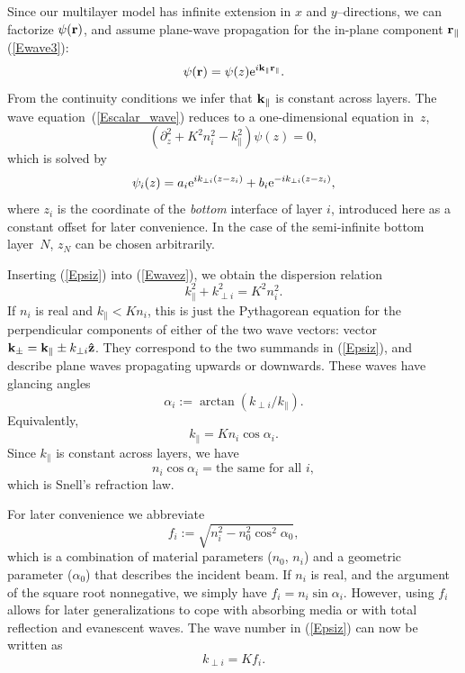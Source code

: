 Since our multilayer model has infinite extension
in $x$ and $y$--directions, we can factorize
$\psi(\mathbf{r})$, and assume plane-wave propagation for
the in-plane component $\mathbf{r}_\parallel$ (\ref{Ewave3}):
\begin{equation}\label{Ewave3dup}
\psi(\mathbf{r}) = \psi(z) {\rm e}^{i \mathbf{k}_\parallel\mathbf{r}_\parallel}.
\end{equation}
From the continuity conditions we infer that $\mathbf{k}_\parallel$
is constant across layers.
The wave equation~(\ref{Escalar_wave})
reduces to a one-dimensional equation in~$z$,
\begin{equation}\label{Ewavez}
\left(\partial_z^2 + K^2n_i^2 - k_\parallel^2 \right) \psi(z) = 0,
\end{equation}
which is solved by
\begin{equation}\label{Epsiz}
  \psi_i(z) = a_i{\rm e}^{ik_{\perp i}(z-z_i)} + b_i{\rm e}^{-ik_{\perp i}(z-z_i)},
\end{equation}
where $z_i$ is the coordinate of the \textit{bottom} interface
of layer $i$,
introduced here as a constant offset for later convenience.
In the case of the semi-infinite bottom layer~$N$,
$z_N$ can be chosen arbitrarily.

Inserting (\ref{Epsiz}) into (\ref{Ewavez}),
we obtain the dispersion relation
\begin{equation}\label{Edisp}
  k_\parallel^2 + k_{\perp i}^2 = K^2 n_i^2.   
\end{equation}
If $n_i$ is real and $k_\parallel<K n_i$,
this is just the Pythagorean equation
for the perpendicular components of either of
the two wave vectors:
vector $\mathbf{k}_\pm=\mathbf{k}_\parallel \pm k_{\perp i}\mathbf{\hat z}$.
They correspond to the two summands in (\ref{Epsiz}),
and describe plane waves propagating upwards or downwards.
These waves have glancing angles
\begin{equation}\label{Edef_alpha}
  \alpha_i:=\arctan(k_{\perp i}/k_\parallel).  
\end{equation}
Equivalently,
\begin{equation}
  k_\parallel=K n_i \cos\alpha_i. 
\end{equation}
Since $k_\parallel$ is constant across layers,
we have
\begin{equation}\label{ESnell}
  n_i \cos\alpha_i = \text{the same for all }i,
\end{equation}
which is Snell's refraction law.

For later convenience we abbreviate
\begin{equation}\label{Edef_f}
f_i := \sqrt{ n_i^2 - n_0^2 \cos^2\alpha_0 },
\end{equation}
which is a combination of material parameters ($n_0$, $n_i$)
and a geometric parameter ($\alpha_0$) that describes the incident beam.
If $n_i$ is real, and the argument of the square root nonnegative,
we simply have $f_i=n_i\sin\alpha_i$.
However, using $f_i$ allows for later generalizations
to cope with absorbing media or with total reflection and evanescent waves.
The wave number in (\ref{Epsiz}) can now be written as
\begin{equation}\label{EkKf}
  k_{\perp i} = K f_i.
\end{equation}


